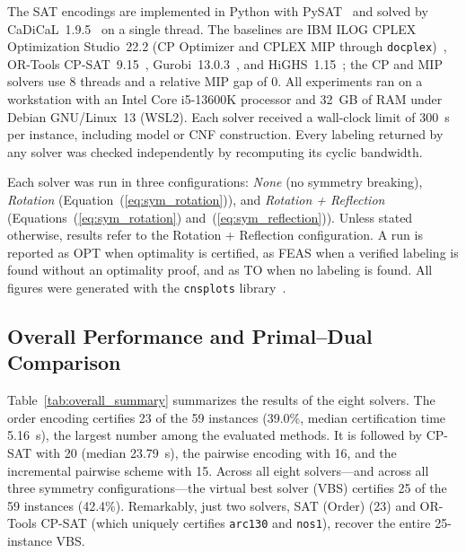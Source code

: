 \documentclass[a4paper,fleqn]{cas-sc}
\begin{document}
The SAT encodings are implemented in Python with PySAT~\citep{ignatiev2018} and solved by CaDiCaL~1.9.5~\citep{biere2024} on a single thread. The baselines are IBM ILOG CPLEX Optimization Studio~22.2 (CP Optimizer and CPLEX MIP through \texttt{docplex})~\citep{cplex}, OR-Tools CP-SAT~9.15~\citep{ortools}, Gurobi~13.0.3~\citep{gurobi}, and HiGHS~1.15~\citep{huangfu2018}; the CP and MIP solvers use 8 threads and a relative MIP gap of 0. All experiments ran on a workstation with an Intel Core i5-13600K processor and 32~GB of RAM under Debian GNU/Linux~13 (WSL2). Each solver received a wall-clock limit of 300~s per instance, including model or CNF construction. Every labeling returned by any solver was checked independently by recomputing its cyclic bandwidth.

Each solver was run in three configurations: \emph{None} (no symmetry breaking), \emph{Rotation} (Equation~(\ref{eq:sym_rotation})), and \emph{Rotation + Reflection} (Equations~(\ref{eq:sym_rotation}) and~(\ref{eq:sym_reflection})). Unless stated otherwise, results refer to the Rotation + Reflection configuration. A run is reported as OPT when optimality is certified, as FEAS when a verified labeling is found without an optimality proof, and as TO when no labeling is found. All figures were generated with the \texttt{cnsplots} library~\citep{cnsplots}.

\subsection{Overall Performance and Primal--Dual Comparison}

Table~\ref{tab:overall_summary} summarizes the results of the eight solvers. The order encoding certifies 23 of the 59 instances (39.0\%, median certification time 5.16~s), the largest number among the evaluated methods. It is followed by CP-SAT with 20 (median 23.79~s), the pairwise encoding with 16, and the incremental pairwise scheme with 15. Across all eight solvers---and across all three symmetry configurations---the virtual best solver (VBS) certifies 25 of the 59 instances (42.4\%). Remarkably, just two solvers, SAT (Order) (23) and OR-Tools CP-SAT (which uniquely certifies \texttt{arc130} and \texttt{nos1}), recover the entire 25-instance VBS.
\end{document}
